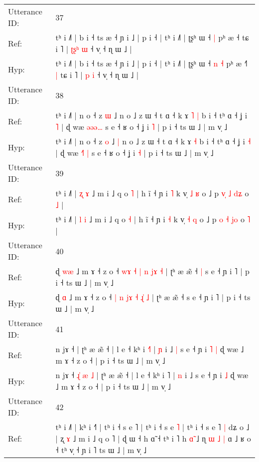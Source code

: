 \documentclass[10pt]{article}
\DeclareRobustCommand{\hl}[1]{{\textcolor{red}{#1}}}
\begin{document}
\begin{longtable}{ll}
\midrule
Utterance ID: & 37 \\
Ref: & tʰ i ˩˥ | b i ˧ ts æ ˧ ɲ i ˩ | p i ˧ | tʰ i ˩˥ | ʈʂʰ ɯ ˧\hl{}\hl{} \hl{|} pʰ æ ˧\hl{}\hl{}\hl{} tɕ i ˥ | \hl{ʈ}\hl{ʂ}\hl{ʰ} \hl{ɯ} ˧ v̩ ˧ ɳ ɯ ˩ |
 \\
Hyp: & tʰ i ˩˥ | b i ˧ ts æ ˧ ɲ i ˩ | p i ˧ | tʰ i ˩˥ | ʈʂʰ ɯ ˧\hl{ }\hl{n} \hl{˧} pʰ æ ˧\hl{˥}\hl{ }\hl{|} tɕ i ˥ | \hl{}\hl{}\hl{p} \hl{i} ˧ v̩ ˧ ɳ ɯ ˩ |
 \\
\midrule
Utterance ID: & 38 \\
Ref: & tʰ i ˩˥ | n o ˧ z \hl{ɯ} ˩\hl{}\hl{} n o ˩ z ɯ ˧ t ɑ ˧ k ɤ\hl{ }\hl{˥} \hl{|} b i ˧ tʰ ɑ ˧ ʝ i \hl{˥} | ɖ wæ \hl{ə}\hl{ə}\hl{ə}\hl{…} s e ˧ ʁ o ˧ ʝ i \hl{˥} | p i ˧ ts ɯ ˩ | m v̩ ˩
 \\
Hyp: & tʰ i ˩˥ | n o ˧ z \hl{o} ˩\hl{ }\hl{|} n o ˩ z ɯ ˧ t ɑ ˧ k ɤ\hl{}\hl{} \hl{˧} b i ˧ tʰ ɑ ˧ ʝ i \hl{˧} | ɖ wæ \hl{˧}\hl{˥}\hl{ }\hl{|} s e ˧ ʁ o ˧ ʝ i \hl{˧} | p i ˧ ts ɯ ˩ | m v̩ ˩
 \\
\midrule
Utterance ID: & 39 \\
Ref: & tʰ i ˩˥ | \hl{ʐ} \hl{ɤ} ˩ m i ˩ q o \hl{˥} | h ĩ ˧ ɲ i \hl{˥} k v̩ \hl{˩} \hl{ʁ} o ˩ p \hl{v}\hl{̩} \hl{˩} \hl{d}\hl{ʑ} o \hl{˩} |
 \\
Hyp: & tʰ i ˩˥ | \hl{l} \hl{i} ˩ m i ˩ q o \hl{˧} | h ĩ ˧ ɲ i \hl{˧} k v̩ \hl{˧} \hl{q} o ˩ p \hl{}\hl{o} \hl{˧} \hl{j}\hl{o} o \hl{˥} |
 \\
\midrule
Utterance ID: & 40 \\
Ref: & ɖ \hl{w}\hl{æ} ˩ m ɤ ˧ z o ˧ \hl{w}\hl{ɤ} \hl{˧} \hl{}\hl{|} \hl{n} \hl{j}\hl{ɤ} \hl{˧} | ʈʰ æ æ̃ ˧\hl{ }\hl{|} s e ˧ ɲ i ˥ | p i ˧ ts ɯ ˩ | m v̩ ˩
 \\
Hyp: & ɖ \hl{}\hl{ɑ} ˩ m ɤ ˧ z o ˧ \hl{}\hl{|} \hl{n} \hl{j}\hl{ɤ} \hl{˧} \hl{ɻ}\hl{̍} \hl{˩} | ʈʰ æ æ̃ ˧\hl{}\hl{} s e ˧ ɲ i ˥ | p i ˧ ts ɯ ˩ | m v̩ ˩
 \\
\midrule
Utterance ID: & 41 \\
Ref: & n jɤ ˧\hl{}\hl{}\hl{}\hl{}\hl{}\hl{}\hl{} | ʈʰ æ æ̃ ˧ | l e ˧ kʰ i \hl{˧}˥ | \hl{ɲ} i ˩\hl{ }\hl{|} s e ˧ ɲ i\hl{ }\hl{˥} \hl{|} ɖ wæ ˩ m ɤ ˧ z o ˧ | p i ˧ ts ɯ ˩ | m v̩ ˩
 \\
Hyp: & n jɤ ˧\hl{ }\hl{ɻ}\hl{̍}\hl{ }\hl{æ}\hl{ }\hl{˩} | ʈʰ æ æ̃ ˧ | l e ˧ kʰ i \hl{}˥ | \hl{n} i ˩\hl{}\hl{} s e ˧ ɲ i\hl{}\hl{} \hl{˩} ɖ wæ ˩ m ɤ ˧ z o ˧ | p i ˧ ts ɯ ˩ | m v̩ ˩
 \\
\midrule
Utterance ID: & 42 \\
Ref: & tʰ i ˩˥ | kʰ i ˧\hl{˥} | tʰ i ˧ s e ˥ | tʰ i ˧ s e \hl{˥} | tʰ i ˧ s e ˥\hl{ }\hl{|} dʑ o ˩ | ʐ \hl{ɤ} ˩ m i ˩ q o ˥ | ɖ ɯ ˧ h ɑ̃ ˧\hl{}\hl{} tʰ i ˥ h \hl{ɑ}̃ ˩ ɳ\hl{ }\hl{ɯ}\hl{ }\hl{˩}\hl{ }\hl{|} ɑ ˩ ʁ o ˧\hl{}\hl{} tʰ v̩ ˧ ɲ i ˥ ts ɯ ˩ | m v̩ ˩

\end{longtable}
\end{document}
